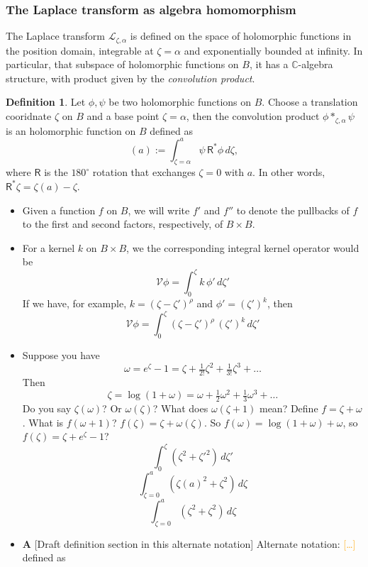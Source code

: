 \documentclass{article}
\newcommand{\C}{\mathbb{C}}
\newcommand{\laplace}{\mathcal{L}}
\theoremstyle{definition}
\newtheorem{definition}{Definition}[section]
\theoremstyle{plain}
\newenvironment{todo}{\color{Coral}}{\color{black}}
\newenvironment{brainstorm}{\color{BlueViolet}\begin{itemize}}{\end{itemize}\color{black}}
\newenvironment{old}{\color{RoyalBlue}}{\color{black}}
\begin{document}
\subsubsection*{The Laplace transform as algebra homomorphism}
The Laplace transform $\laplace_{\zeta,\alpha}$ is defined on the space of holomorphic functions in the position domain, integrable at $\zeta=\alpha$ and exponentially bounded at infinity. In particular, that subspace of holomorphic functions on $B$, it has a $\C$-algebra structure, with product given by the \textit{convolution product}. 
\begin{old}
    \begin{definition}%
Let $\phi,\psi$ be two holomorphic functions on $B$. Choose a translation cooridnate $\zeta$ on $B$ and a base point $\zeta=\alpha$, then the convolution product $\phi\ast_{\zeta,\alpha}\psi$ is an holomorphic function on $B$ defined as
\begin{equation}%
[\phi \ast_{\zeta, \alpha} \psi](a) := \int_{\zeta = \alpha}^a \psi\,\mathsf{R}^*\phi\,d\zeta,
\end{equation}
where $\mathsf{R}$ is the $180^\circ$ rotation that exchanges $\zeta = 0$ with $a$. In other words, $\mathsf{R}^*\zeta = \zeta(a) - \zeta$.
\begin{brainstorm}
\item Given a function $f$ on $B$, we will write $f'$ and $f''$ to denote the pullbacks of $f$ to the first and second factors, respectively, of $B \times B$.
\item For a kernel $k$ on $B \times B$, we the corresponding integral kernel operator would be
\[ \mathcal{V}\phi = \int_0^\zeta k\,\phi'\,d\zeta' \]
If we have, for example, $k = (\zeta - \zeta')^\rho$ and $\phi' = (\zeta')^k$, then
\[ \mathcal{V}\phi = \int_0^\zeta (\zeta - \zeta')^\rho\,(\zeta')^k\,d\zeta' \]
\item Suppose you have
\[ \omega = e^\zeta - 1 = \zeta + \tfrac{1}{2!} \zeta^2 + \tfrac{1}{3!} \zeta^3 + \ldots \]
Then
\[ \zeta = \log(1 + \omega) = \omega + \tfrac{1}{2} \omega^2 + \tfrac{1}{3} \omega^3 + \ldots \]
Do you say $\zeta(\omega)$? Or $\omega(\zeta)$? What does $\omega(\zeta + 1)$ mean? Define $f = \zeta + \omega$. What is $f(\omega + 1)$? $f(\zeta) = \zeta + \omega(\zeta)$. So $f(\omega) = \log(1 + \omega) + \omega$, so $f(\zeta) = \zeta + e^\zeta - 1$?
\[ \int_0^\zeta (\zeta^2 + \zeta'^2)\,d\zeta' \]
\[ \int_{\zeta=0}^a (\zeta(a)^2 + \zeta^2)\,d\zeta \]
\[ \int_{\zeta=0}^a (\zeta^2 + \zeta^2)\,d\zeta \]
\item \begin{todo}\textbf{A} [Draft definition section in this alternate notation]\end{todo} Alternate notation: \textcolor{orange}{[\ldots]} defined as

\end{brainstorm}
\end{definition}
\end{old}
\end{document}
